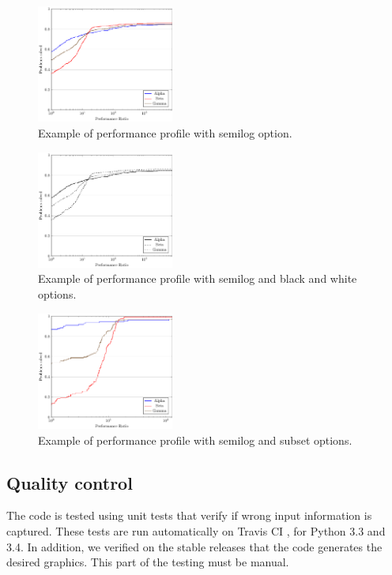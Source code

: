     \begin{figure}[!ht]
      \centering
      \includegraphics[width=0.4\textwidth]{plots/abc-semilog.pdf}
      \caption{Example of performance profile with semilog option.}
      \label{fig:example2}
    \end{figure}
    \begin{figure}[!ht]
      \centering
      \includegraphics[width=0.4\textwidth]{plots/abc-semilog-bw.pdf}
      \caption{Example of performance profile with semilog and black and white
        options.}
      \label{fig:example3}
    \end{figure}
    \begin{figure}[!ht]
      \centering
      \includegraphics[width=0.4\textwidth]{plots/abc-semilog-hs.pdf}
      \caption{Example of performance profile with semilog and subset options.}
      \label{fig:example4}
    \end{figure}

\subsection*{Quality control}

    The code is tested using unit tests that verify if wrong input information
    is captured. These tests are run automatically on Travis CI
    \cite{url:travis}, for Python 3.3 and 3.4.
    In addition, we verified on the stable releases that the code generates the
    desired graphics. This part of the testing must be manual.

